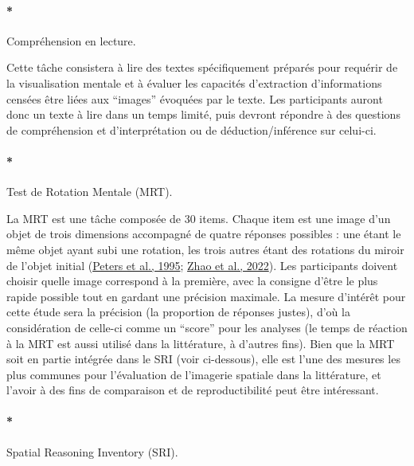 \documentclass[
  12pt,
]{article}
\let\oldparagraph\paragraph
\renewcommand{\paragraph}[1]{\oldparagraph{#1}\mbox{}}
\begin{document}
\hypertarget{compruxe9hension-en-lecture.}{%
\paragraph*{Compréhension en
lecture.}\label{compruxe9hension-en-lecture.}}

Cette tâche consistera à lire des textes spécifiquement préparés pour
requérir de la visualisation mentale et à évaluer les capacités
d'extraction d'informations censées être liées aux ``images'' évoquées
par le texte. Les participants auront donc un texte à lire dans un temps
limité, puis devront répondre à des questions de compréhension et
d'interprétation ou de déduction/inférence sur celui-ci.

\hypertarget{test-de-rotation-mentale-mrt.}{%
\paragraph*{Test de Rotation Mentale
(MRT).}\label{test-de-rotation-mentale-mrt.}}

La MRT est une tâche composée de 30 items. Chaque item est une image
d'un objet de trois dimensions accompagné de quatre réponses possibles :
une étant le même objet ayant subi une rotation, les trois autres étant
des rotations du miroir de l'objet initial
(\protect\hyperlink{ref-petersRedrawnVandenbergKuse1995}{Peters et al.,
1995}; \protect\hyperlink{ref-zhaoSpatialTransformationMental2022}{Zhao
et al., 2022}). Les participants doivent choisir quelle image correspond
à la première, avec la consigne d'être le plus rapide possible tout en
gardant une précision maximale. La mesure d'intérêt pour cette étude
sera la précision (la proportion de réponses justes), d'où la
considération de celle-ci comme un ``score'' pour les analyses (le temps
de réaction à la MRT est aussi utilisé dans la littérature, à d'autres
fins). Bien que la MRT soit en partie intégrée dans le SRI (voir
ci-dessous), elle est l'une des mesures les plus communes pour
l'évaluation de l'imagerie spatiale dans la littérature, et l'avoir à
des fins de comparaison et de reproductibilité peut être intéressant.

\hypertarget{spatial-reasoning-inventory-sri.}{%
\paragraph*{Spatial Reasoning Inventory
(SRI).}\label{spatial-reasoning-inventory-sri.}}
\end{document}
